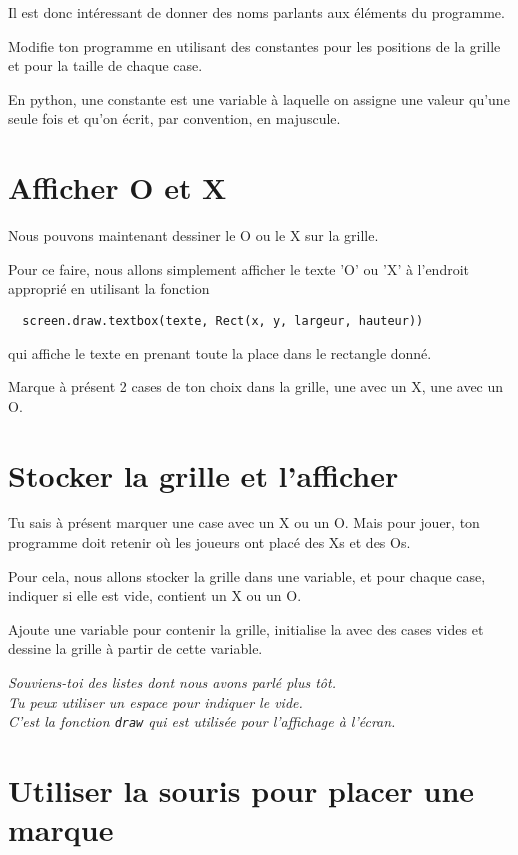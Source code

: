 \documentclass[11pt]{article}
\begin{document}
Il est donc intéressant de donner des noms parlants aux éléments du programme.

Modifie ton programme en utilisant des constantes pour les positions de la grille et pour la taille de chaque case.

En python, une constante est une variable à laquelle on assigne une valeur qu'une seule fois et qu'on écrit, par convention, en majuscule.

\section{Afficher O et X}

Nous pouvons maintenant dessiner le O ou le X sur la grille.

Pour ce faire, nous allons simplement afficher le texte 'O' ou 'X' à l'endroit approprié en utilisant la fonction
\begin{lstlisting}
  screen.draw.textbox(texte, Rect(x, y, largeur, hauteur))
\end{lstlisting}

qui affiche le texte en prenant toute la place dans le rectangle donné.

Marque à présent 2 cases de ton choix dans la grille, une avec un X, une avec un O.

\section{Stocker la grille et l'afficher}

Tu sais à présent marquer une case avec un X ou un O. Mais pour jouer, ton programme doit retenir où les joueurs ont placé des Xs et des Os.

Pour cela, nous allons stocker la grille dans une variable, et pour chaque case, indiquer si elle est vide, contient un X ou un O.

Ajoute une variable pour contenir la grille, initialise la avec des cases vides et dessine la grille à partir de cette variable.

\textit{
Souviens-toi des listes dont nous avons parlé plus tôt.\\
Tu peux utiliser un espace pour indiquer le vide.\\
C'est la fonction \lstinline{draw} qui est utilisée pour l'affichage à l'écran.
}

\section{Utiliser la souris pour placer une marque}
\end{document}
